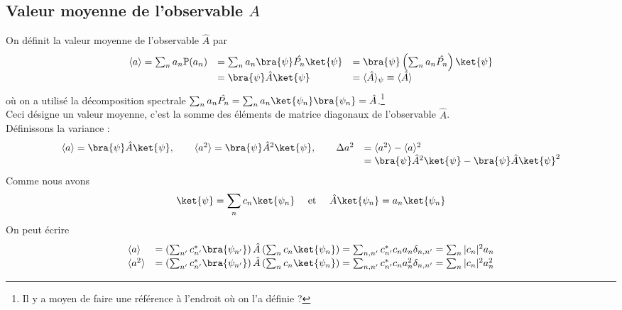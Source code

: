  \subsection{Valeur moyenne de l'observable $\hat{A}$}
 
 On définit la valeur moyenne de l'observable $\hat{A}$ par
 \begin{equation}
\begin{array}{lll}
 \langle a\rangle = \sum_n a_n\mathbb{P}(a_n) &= \sum_n a_n\bra{\psi}\hat{P_n}\ket{\psi} &=  
 \bra{\psi}\left(\sum_n a_n\hat{P_n}\right)\ket{\psi}\\
 &= \bra{\psi}\hat{A}\ket{\psi} &= \langle \hat{A}\rangle_\psi \equiv \langle\hat{A}\rangle
\end{array}
 \end{equation}
 où on a utilisé la décomposition spectrale $\sum_n a_n\hat{P_n} = \sum_n a_n\ket{\psi_n}\bra{\psi_n}
 = \hat{A} $.\footnote{Il y a moyen de faire une référence à l'endroit où on l'a définie ?}\\
 Ceci désigne un valeur moyenne, c'est la somme des éléments de matrice diagonaux de 
 l'observable $\hat{A}$. \\
 Définissons la variance :
 \begin{equation}
 \begin{array}{ll}
 \langle a\rangle = \bra{\psi}\hat{A}\ket{\psi},\qquad  \langle a^2\rangle = \bra{\psi}\hat{A}^2
 \ket{\psi}, \qquad \Delta a^2 &=  \langle a^2\rangle - \langle a\rangle^2\\
 &= \bra{\psi}\hat{A}^2\ket{\psi} - \bra{\psi}\hat{A}\ket{\psi}^2
 \end{array}
 \end{equation}
 Comme nous avons 
 \begin{equation}
 \ket{\psi} = \sum_n c_n \ket{\psi_n}\quad\text{ et }\quad \hat{A}\ket{\psi_n}=a_n\ket{\psi_n}
 \end{equation}
 On peut écrire
 \begin{equation}
 \begin{array}{ll}
 \langle a \rangle &= \left(\sum_{n'} c_{n'}^*\bra{\psi_{n'}}\right)\hat{A}\left(
 \sum_n c_n\ket{\psi_n}\right)= \sum_{n,n'} c_{n'}^*c_n a_n\delta_{n,n'} = \sum_n |c_n|^2 a_n\\
 \langle a^2 \rangle &= \left(\sum_{n'} c_{n'}^*\bra{\psi_{n'}}\right)\hat{A}\left(
 \sum_n c_n\ket{\psi_n}\right)= \sum_{n,n'} c_{n'}^*c_n a_n^2\delta_{n,n'} = \sum_n |c_n|^2 a_n^2 
 \end{array}
 \end{equation}
